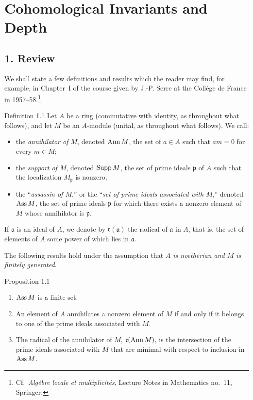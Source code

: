 \makeatletter
\providecommand{\sgareaderlabel}[2]{%
  \begingroup
  \def\@currentlabel{#2}%
  \phantomsection\label{#1}%
  \endgroup}
\makeatother

\chapter{Cohomological Invariants and Depth}
\label{III}

\section*{1. Review}
\sgareaderlabel{III.1}{1}

We shall state a few definitions and results which the reader may
find, for example, in Chapter~I of the course given by J.-P. Serre at the
Collège de France in 1957--58.\footnote{\sgareaderlabel{noteserre}{*}Cf.\ \emph{Algèbre locale et multiplicités}, Lecture Notes in
Mathematics no.~11, Springer.}

\begin{sgastatement}{Definition 1.1}\sgareaderlabel{def:III.1.1}{1.1}
Let $A$ be a ring (commutative with identity, as throughout what follows), and
let $M$ be an $A$-module (unital, as throughout what follows). We call:
\begin{itemize}[leftmargin=2.2em]
  \item the \emph{annihilator of $M$}, denoted $\operatorname{Ann} M$, the set of
  $a\in A$ such that $am=0$ for every $m\in M$;
  \item the \emph{support of $M$}, denoted $\operatorname{Supp} M$, the set of prime
  ideals $\mathfrak p$ of $A$ such that the localization $M_{\mathfrak p}$
  is nonzero;
  \item the “\emph{assassin of $M$},” or the “\emph{set of prime ideals
  associated with $M$},” denoted $\operatorname{Ass} M$, the set of prime ideals
  $\mathfrak p$ for which there exists a nonzero element of $M$ whose
  annihilator is $\mathfrak p$.
\end{itemize}
If $\mathfrak a$ is an ideal of $A$, we denote by $\mathfrak r(\mathfrak a)$
the radical of $\mathfrak a$ in $A$, that is, the set of elements of $A$ some
power of which lies in $\mathfrak a$.
\end{sgastatement}

The following results hold under the assumption that \emph{$A$ is noetherian
and $M$ is finitely generated}.

\begin{sgastatement}{Proposition 1.1}\sgareaderlabel{III.1.1}{1.1}
\begin{enumerate}[label=\textup{(\roman*)},leftmargin=2.5em]
  \item $\operatorname{Ass} M$ is a finite set.
  \item An element of $A$ annihilates a nonzero element of $M$ if and only
  if it belongs to one of the prime ideals associated with $M$.
  \item The radical of the annihilator of $M$,
  $\mathfrak r(\operatorname{Ann} M)$, is the intersection of the prime ideals associated
  with $M$ that are minimal with respect to inclusion in $\operatorname{Ass} M$.
\end{enumerate}
\end{sgastatement}

